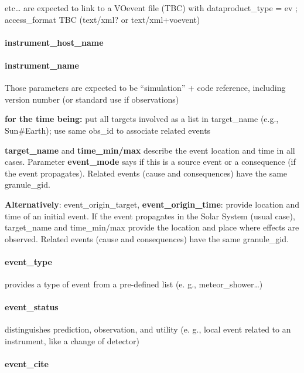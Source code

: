 \documentclass[11pt,a4paper]{ivoa}
\begin{document}
etc… are expected to link to a VOevent file (TBC) with dataproduct\_type = ev ; access\_format TBC (text/xml? or text/xml+voevent)

\paragraph{instrument\_host\_name}

\paragraph{instrument\_name}

Those parameters are expected to be ``simulation'' + code reference, including version number (or standard use if observations)

\textbf{for the time being:} put all targets involved as a list in target\_name (e.g., Sun\#Earth); use same obs\_id to associate related events

\textbf{ target\_name }and\textbf{ time\_min/max} describe the event location and time in all cases. Parameter \textbf{event\_mode} says if this is a source event or a consequence (if the event propagates). Related events (cause and consequences) have the same granule\_gid.

\textbf{}\textbf{Alternatively}: event\_origin\_target, \textbf{event\_origin\_time}: provide location and time of an initial event. If the event propagates in the Solar System (usual case), target\_name and time\_min/max provide the location and place where effects are observed. Related events (cause and consequences) have the same granule\_gid.

\paragraph{event\_type}

provides a type of event from a pre-defined list (e. g., meteor\_shower…)

\paragraph{event\_status}

distinguishes prediction, observation, and utility (e. g., local event related to an instrument, like a change of detector)

\paragraph{event\_cite}
\end{document}
